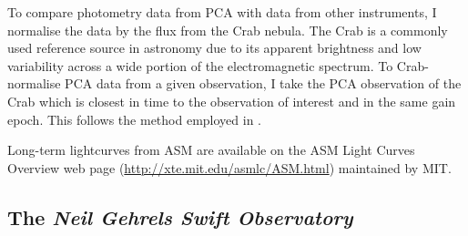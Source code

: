 \par To compare photometry data from PCA with data from other instruments, I normalise the data by the flux from the Crab nebula.  The Crab is a commonly used reference source in astronomy due to its apparent brightness and low variability across a wide portion of the electromagnetic spectrum.  To Crab-normalise PCA data from a given observation, I take the PCA observation of the Crab which is closest in time to the observation of interest and in the same gain epoch.  This follows the method employed in \citet{Altamirano_CrabNorm}.
\par Long-term lightcurves from ASM are available on the ASM Light Curves Overview web page (\url{http://xte.mit.edu/asmlc/ASM.html}) maintained by MIT.

\subsection{The \textit{Neil Gehrels Swift Observatory}}

